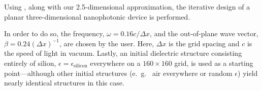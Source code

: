 % 
% 
% 
Using , along with our 2.5-dimensional approximation, the iterative design of a planar three-dimensional nanophotonic device is performed\cite{Lu11}.

In order to do so, the frequency, $\omega = 0.16 c/\Delta x$, and the out-of-plane wave vector, $\beta = 0.24 (\Delta x)^{-1}$, are chosen by the user. Here, $\Delta x$ is the grid spacing and $c$ is the speed of light in vacuum. Lastly, an initial dielectric structure consisting entirely of silion, $\epsilon = \epsilon_\text{silicon}$ everywhere on a $160 \times 160$ grid, is used as a starting point---although other initial structures (e.~g.~ air everywhere or random $\epsilon$) yield nearly identical structures in this case.


